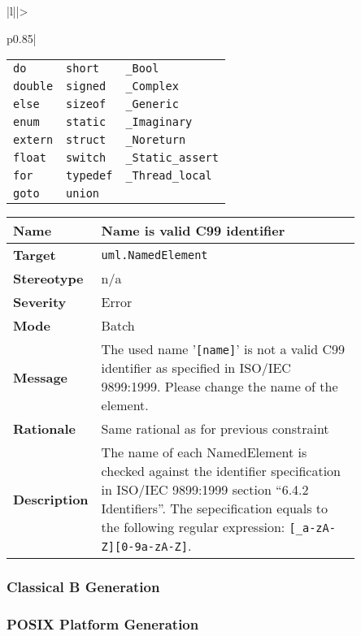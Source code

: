 \documentclass{template/openetcs_article}
\begin{document}
\begin{longtable}{|l||>{\raggedright}p{0.85\linewidth}|}
\begin{tabular}{l l l}
                           \texttt{do}       & \texttt{short}    & \texttt{\_Bool}          \\
                           \texttt{double}   & \texttt{signed}   & \texttt{\_Complex}       \\
                           \texttt{else}     & \texttt{sizeof}   & \texttt{\_Generic}       \\
                           \texttt{enum}     & \texttt{static}   & \texttt{\_Imaginary}     \\
                           \texttt{extern}   & \texttt{struct}   & \texttt{\_Noreturn}      \\
                           \texttt{float}    & \texttt{switch}   & \texttt{\_Static\_assert} \\
                           \texttt{for}      & \texttt{typedef}  & \texttt{\_Thread\_local}  \\
                           \texttt{goto}     & \texttt{union} \\
                         \end{tabular}\tabularnewline \hline
\end{longtable}

\begin{longtable}{|l||>{\raggedright}p{0.85\linewidth}|}
  \hline
  \textbf{Name}        &  Name is valid C99 identifier \tabularnewline \hline
  \textbf{Target}      &  \texttt{uml.NamedElement} \tabularnewline \hline
  \textbf{Stereotype}  &  n/a \tabularnewline \hline
  \textbf{Severity}    &  Error \tabularnewline \hline
  \textbf{Mode}        &  Batch \tabularnewline \hline
  \textbf{Message}     &  The used name '\texttt{[name]}' is not a valid C99 identifier as specified in 
                          ISO/IEC 9899:1999. Please change the name of the element. \tabularnewline \hline
  \textbf{Rationale}   &  Same rational as for previous constraint \tabularnewline \hline
  \textbf{Description} &  The name of each NamedElement is checked against the identifier specification
                          in ISO/IEC 9899:1999 section ``6.4.2 Identifiers''. The sepecification equals to the
                          following regular expression: \texttt{[\_a-zA-Z][0-9a-zA-Z\*]}. \tabularnewline \hline
\end{longtable}


\subsubsection{Classical B Generation}

\subsubsection{POSIX Platform Generation}


% 
% 

\end{document}
